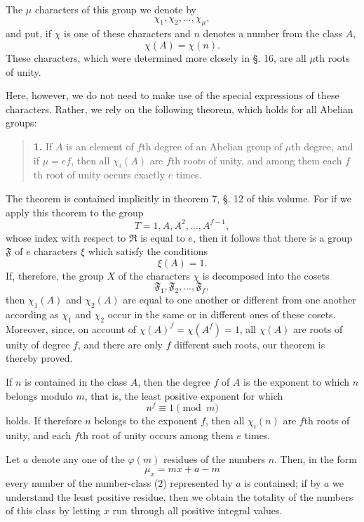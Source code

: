 \documentclass[11pt]{article}
\begin{document}
The $\mu$ characters of this group we denote by
\begin{equation}\tag{3}
\chi_1,\chi_2,\ldots,\chi_\mu,
\end{equation}
and put, if $\chi$ is one of these characters and $n$ denotes a number from the class $A$,
\begin{equation}\tag{4}
\chi(A)=\chi(n).
\end{equation}
These characters, which were determined more closely in §. 16, are all $\mu$th roots of unity.

Here, however, we do not need to make use of the special expressions of these characters. Rather, we rely on the following theorem, which holds for all Abelian groups:

\begin{quote}
\textbf{1.} If $A$ is an element of $f$th degree of an Abelian group of $\mu$th degree, and if $\mu=ef$, then all $\chi_i(A)$ are $f$th roots of unity, and among them each $f$th root of unity occurs exactly $e$ times.
\end{quote}

The theorem is contained implicitly in theorem 7, §. 12 of this volume. For if we apply this theorem to the group
\[
T=1,A,A^2,\ldots,A^{f-1},
\]
whose index with respect to $\mathfrak R$ is equal to $e$, then it follows that there is a group $\mathfrak F$ of $e$ characters $\xi$ which satisfy the conditions
\[
\xi(A)=1.
\]
If, therefore, the group $X$ of the characters $\chi$ is decomposed into the cosets
\[
\mathfrak F_1,\mathfrak F_2,\ldots,\mathfrak F_f,
\]
then $\chi_1(A)$ and $\chi_2(A)$ are equal to one another or different from one another according as $\chi_1$ and $\chi_2$ occur in the same or in different ones of these cosets. Moreover, since, on account of $\chi(A)^f=\chi(A^f)=1$, all $\chi(A)$ are roots of unity of degree $f$, and there are only $f$ different such roots, our theorem is thereby proved.

If $n$ is contained in the class $A$, then the degree $f$ of $A$ is the exponent to which $n$ belongs modulo $m$, that is, the least positive exponent for which
\begin{equation}\tag{5}
n^f\equiv1 \pmod m
\end{equation}
holds. If therefore $n$ belongs to the exponent $f$, then all $\chi_i(n)$ are $f$th roots of unity, and each $f$th root of unity occurs among them $e$ times.

Let $a$ denote any one of the $\varphi(m)$ residues of the numbers $n$. Then, in the form
\begin{equation}\tag{6}
\mu_x=mx+a-m
\end{equation}
every number of the number-class (2) represented by $a$ is contained; if by $a$ we understand the least positive residue, then we obtain the totality of the numbers of this class by letting $x$ run through all positive integral values.
\end{document}
